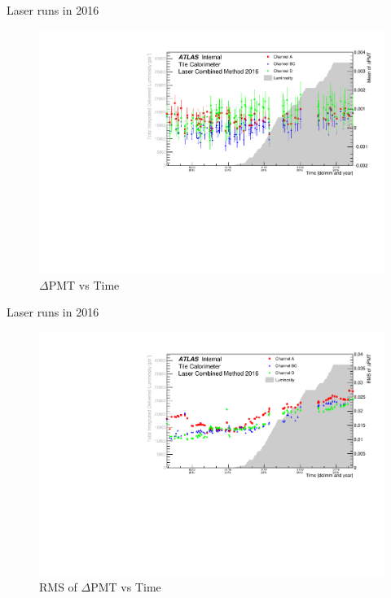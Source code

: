\documentclass{beamer}
\begin{document}
\begin{frame}{Laser runs in 2016}{}
\begin{figure}
\centering
\includegraphics[width=\textwidth]{pmtm16.pdf}
\caption{$\Delta$PMT vs Time}
\end{figure}
\end{frame}

\begin{frame}{Laser runs in 2016}{}
\begin{figure}
\centering
\includegraphics[width=\textwidth]{pmtr16.pdf}
\caption{RMS of $\Delta$PMT vs Time}
\end{figure}
\end{frame}
\end{document}
